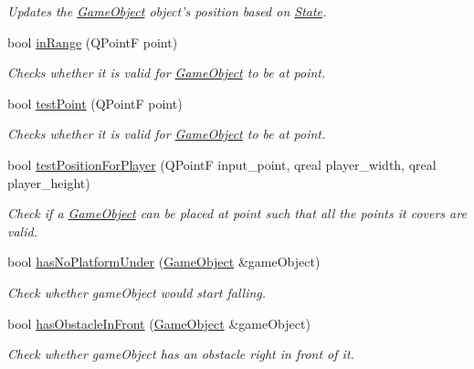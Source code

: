 \begin{DoxyCompactItemize}
\begin{DoxyCompactList}\small\item\em Updates the \hyperlink{classGameObject}{Game\-Object} object's position based on \hyperlink{classState}{State}. \end{DoxyCompactList}\item 
bool \hyperlink{classPhysicsComponent_a75cfebb94e323fd00935c369b2b8e11f}{in\-Range} (Q\-Point\-F point)
\begin{DoxyCompactList}\small\item\em Checks whether it is valid for \hyperlink{classGameObject}{Game\-Object} to be at point. \end{DoxyCompactList}\item 
bool \hyperlink{classPhysicsComponent_ab8dc7351bb7ac17177840669ef6abaaa}{test\-Point} (Q\-Point\-F point)
\begin{DoxyCompactList}\small\item\em Checks whether it is valid for \hyperlink{classGameObject}{Game\-Object} to be at point. \end{DoxyCompactList}\item 
bool \hyperlink{classPhysicsComponent_ae0c5998a85b314cb5ea324f509f919a8}{test\-Position\-For\-Player} (Q\-Point\-F input\-\_\-point, qreal player\-\_\-width, qreal player\-\_\-height)
\begin{DoxyCompactList}\small\item\em Check if a \hyperlink{classGameObject}{Game\-Object} can be placed at point such that all the points it covers are valid. \end{DoxyCompactList}\item 
bool \hyperlink{classPhysicsComponent_a2f2fab8cd26c709f50d44d404455f700}{has\-No\-Platform\-Under} (\hyperlink{classGameObject}{Game\-Object} \&game\-Object)
\begin{DoxyCompactList}\small\item\em Check whether game\-Object would start falling. \end{DoxyCompactList}\item 
bool \hyperlink{classPhysicsComponent_a552bad9336bf5cf9e9ee73c685a53edd}{has\-Obstacle\-In\-Front} (\hyperlink{classGameObject}{Game\-Object} \&game\-Object)
\begin{DoxyCompactList}\small\item\em Check whether game\-Object has an obstacle right in front of it. \end{DoxyCompactList}\end{DoxyCompactItemize}
